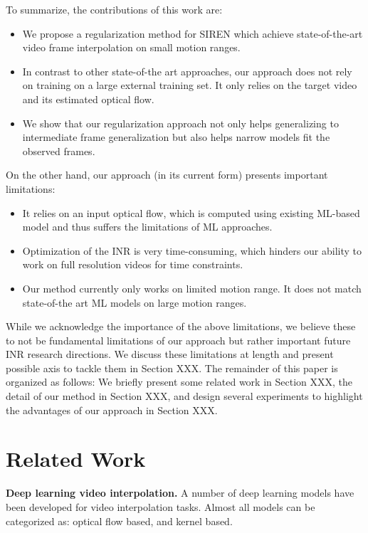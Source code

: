 \documentclass{article}
\begin{document}
To summarize, the contributions of this work are:
\begin{itemize}
\item We propose a regularization method for SIREN which achieve state-of-the-art video frame interpolation on small motion ranges.
\item In contrast to other state-of-the art approaches, our approach does not rely on training on a large external training set.
It only relies on the target video and its estimated optical flow.
\item We show that our regularization approach not only helps generalizing to intermediate frame generalization
but also helps narrow models fit the observed frames.
\end{itemize}

On the other hand, our approach (in its current form) presents important limitations:

\begin{itemize}
\item It relies on an input optical flow, which is computed using existing ML-based model and thus suffers the limitations of ML approaches.
\item Optimization of the INR is very time-consuming, which hinders our ability to work on full resolution videos for time constraints.
\item Our method currently only works on limited motion range. It does not match state-of-the art ML models on large motion ranges.
\end{itemize}

While we acknowledge the importance of the above limitations,
we believe these to not be fundamental limitations of our approach but rather important future INR research directions.
We discuss these limitations at length and present possible axis to tackle them in Section XXX.
The remainder of this paper is organized as follows:
We briefly present some related work in Section XXX, the detail of our method in Section XXX,
and design several experiments to highlight the advantages of our approach in Section XXX.

\section{Related Work}

\textbf{Deep learning video interpolation.}
A number of deep learning models have been developed for video interpolation tasks.
Almost all models can be categorized as: optical flow based, and kernel based.
\end{document}
